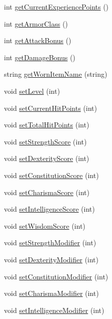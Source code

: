 \begin{DoxyCompactItemize}
int \hyperlink{class_character_a79ce6ccb3e7d78ea75905d8d3f2ba4e2}{get\+Current\+Experience\+Points} ()
\item 
int \hyperlink{class_character_a10f27e812da8b25d4f44dbf6f3533fb2}{get\+Armor\+Class} ()
\item 
int \hyperlink{class_character_a94cb25ccbde6ccbc6aa6b3cca01dfebc}{get\+Attack\+Bonus} ()
\item 
int \hyperlink{class_character_a20ac6eab8a1df8ce849ad1015f656f96}{get\+Damage\+Bonus} ()
\item 
string \hyperlink{class_character_a3450bf341e820b6c14f3c3a2ebd7a3c3}{get\+Worn\+Item\+Name} (string)
\item 
void \hyperlink{class_character_a470a76c1062d97e40ce97997a4fdc62a}{set\+Level} (int)
\item 
void \hyperlink{class_character_a5a60696b6a658e78a08b3c098e1446d6}{set\+Current\+Hit\+Points} (int)
\item 
void \hyperlink{class_character_af277a2f17f94a7880af3204a4b824e06}{set\+Total\+Hit\+Points} (int)
\item 
void \hyperlink{class_character_a62ec21599695d548cada86de053dc51a}{set\+Strength\+Score} (int)
\item 
void \hyperlink{class_character_a6714e60888cf852dd48d45919c0e29c6}{set\+Dexterity\+Score} (int)
\item 
void \hyperlink{class_character_a959e82d760840d33ab95a264c549a8c6}{set\+Constitution\+Score} (int)
\item 
void \hyperlink{class_character_a7dff5255c010da8590f493078ab05db2}{set\+Charisma\+Score} (int)
\item 
void \hyperlink{class_character_a34f038f813b6b1522f41ba04f4620628}{set\+Intelligence\+Score} (int)
\item 
void \hyperlink{class_character_a9940a14b5050a9962ec6a042363a90d6}{set\+Wisdom\+Score} (int)
\item 
void \hyperlink{class_character_a543005270d3aa62d9aa0cb35aeac58b3}{set\+Strength\+Modifier} (int)
\item 
void \hyperlink{class_character_a667cb495021fa02cf0f0abebade3e3aa}{set\+Dexterity\+Modifier} (int)
\item 
void \hyperlink{class_character_ac550c6455f74ecbac744523fa82148c3}{set\+Constitution\+Modifier} (int)
\item 
void \hyperlink{class_character_a28ba83aeb0fae1450f69193001e433ec}{set\+Charisma\+Modifier} (int)
\item 
void \hyperlink{class_character_a554260d3ec37497bbdc7f1a22ddd7c78}{set\+Intelligence\+Modifier} (int)

\end{DoxyCompactItemize}
